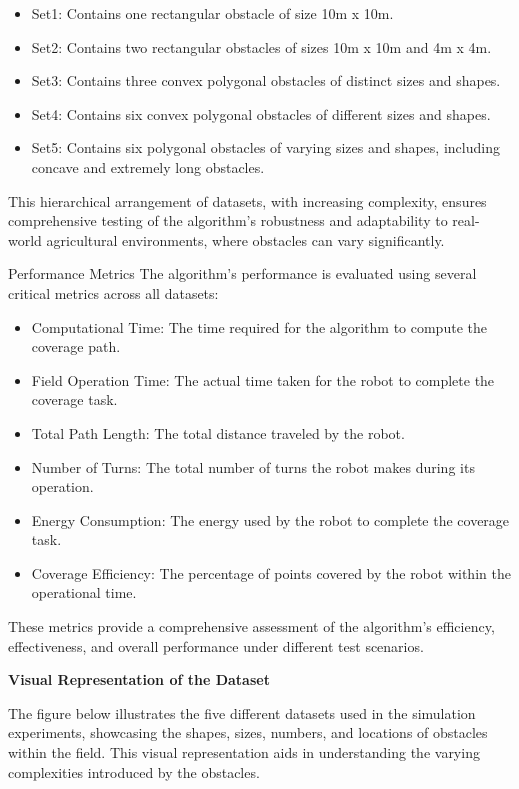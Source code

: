 \begin{itemize}
    \item Set1: Contains one rectangular obstacle of size 10m x 10m.
    \item Set2: Contains two rectangular obstacles of sizes 10m x 10m and 4m x 4m.
    \item Set3: Contains three convex polygonal obstacles of distinct sizes and shapes.
    \item Set4: Contains six convex polygonal obstacles of different sizes and shapes.
    \item Set5: Contains six polygonal obstacles of varying sizes and shapes, including concave and extremely long obstacles.
\end{itemize}
This hierarchical arrangement of datasets, with increasing complexity, ensures comprehensive testing of the algorithm's robustness and adaptability to real-world agricultural environments, where obstacles can vary significantly.

\vspace*{6mm}  

Performance Metrics
The algorithm's performance is evaluated using several critical metrics across all datasets:

\begin{itemize}
    \item Computational Time: The time required for the algorithm to compute the coverage path.
    \item Field Operation Time: The actual time taken for the robot to complete the coverage task.
    \item Total Path Length: The total distance traveled by the robot.
    \item Number of Turns: The total number of turns the robot makes during its operation.
    \item Energy Consumption: The energy used by the robot to complete the coverage task.
    \item Coverage Efficiency: The percentage of points covered by the robot within the operational time.
\end{itemize}
These metrics provide a comprehensive assessment of the algorithm's efficiency, effectiveness, and overall performance under different test scenarios.


\vspace*{6mm}  

\textbf{Visual Representation of the Dataset}

The figure below illustrates the five different datasets used in the simulation experiments, showcasing the shapes, sizes, numbers, and locations of obstacles within the field. This visual representation aids in understanding the varying complexities introduced by the obstacles.



